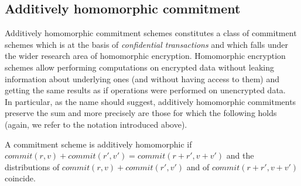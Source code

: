 \subsection{Additively homomorphic commitment}
\label{add_homomorphic_commit}
Additively homomorphic commitment schemes constitutes a class of commitment schemes which is at the basis of \textit{confidential transactions} and which falls under the wider research area of homomorphic encryption. Homomorphic encryption schemes allow performing computations on encrypted data without leaking information about underlying ones (and without having access to them) and getting the same results as if operations were performed on unencrypted data.\\
In particular, as the name should suggest, additively homomorphic commitments preserve the sum and more precisely are those for which the following holds (again, we refer to the notation introduced above).
\begin{mydef}
\label{additively_homo_def}
    A commitment scheme is additively homomorphic if\\ $commit(r,v) + commit(r',v') = commit(r+r',v+v')$ and the distributions of $commit(r,v) + commit(r',v')$ and of $commit(r+r',v+v')$ coincide.
\end{mydef}

